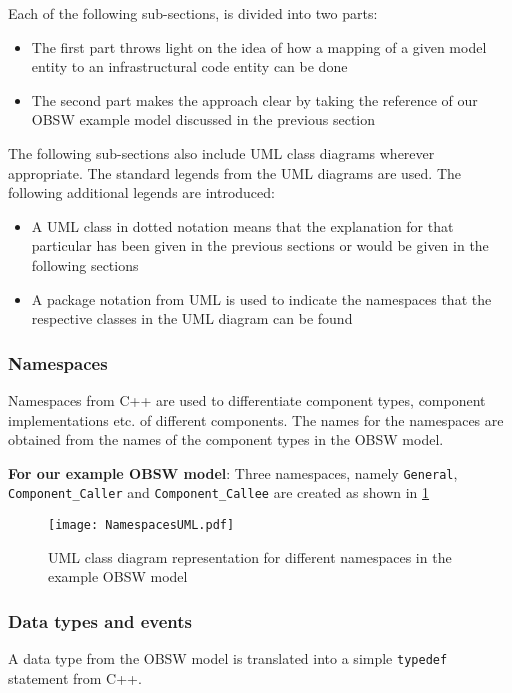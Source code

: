 Each of the following sub-sections, is divided into two parts:
\begin{itemize}
\item The first part throws light on the idea of how a mapping of a given model entity to an infrastructural code entity can be done
\item The second part makes the approach clear by taking the reference of our OBSW example model discussed in the previous section  
\end{itemize}

The following sub-sections also include UML class diagrams wherever appropriate. The standard legends from the UML diagrams are used. The following additional legends are introduced:
\begin{itemize}
\item A UML class in dotted notation means that the explanation for that particular has been given in the previous sections or would be given in the following sections 
\item A package notation from UML is used to indicate the namespaces that the respective classes in the UML diagram can be found
\end{itemize}  

\subsubsection{\textbf{Namespaces}}
Namespaces from C++ are used to differentiate component types, component implementations etc. of different components. The names for the namespaces are obtained from the names of the component types in the OBSW model.

\textbf{For our example OBSW model}: Three namespaces, namely \texttt{General}, \texttt{Component\_Caller} and \texttt{Component\_Callee} are created as shown in \cref{fig: PackagesUML}

\begin{figure}[h]
	\centering
	\texttt{[image: NamespacesUML.pdf]}
	\caption{UML class diagram representation for different namespaces in the example OBSW model}
	\label{fig: PackagesUML}
\end{figure}

\subsubsection{\textbf{Data types and events}}
A data type from the OBSW model is translated into a simple \texttt{typedef} statement from C++.

